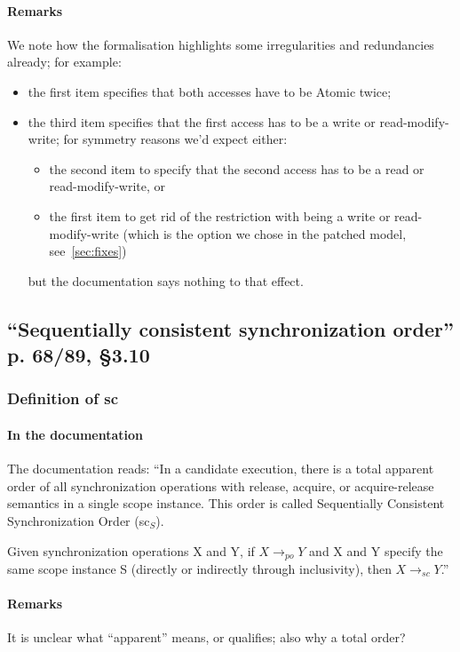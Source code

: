 \documentclass[a4paper]{article}
\begin{document}
\paragraph{Remarks}
We note how the formalisation highlights some irregularities and redundancies
already; for example:
\begin{itemize}
\item the first item specifies that both accesses have to be Atomic twice;
\item the third item specifies that the first access has to be a write or
read-modify-write; for symmetry reasons we'd expect either:
\begin{itemize}
\item the second item to specify that the second access has to be a read or
read-modify-write, or 
\item the first item to get rid of the restriction with being a write or
read-modify-write (which is the option we chose in the patched model,
see~\mysec\ref{sec:fixes})
\end{itemize}
but the documentation says nothing to that effect.
\end{itemize}

\subsection{``Sequentially consistent synchronization order'' p. 68/89, \S 3.10}

\subsubsection{Definition of sc}

\paragraph{In the documentation}
The documentation reads: ``In a candidate execution, there is a total apparent
order of all synchronization operations with release, acquire, or
acquire-release semantics in a single scope instance. This order is called
Sequentially Consistent Synchronization Order (sc$_S$).

Given synchronization operations X and Y, if $X \rightarrow_{po} Y$ and X and Y
specify the same scope instance S (directly or indirectly through inclusivity),
then $X \rightarrow_{sc} Y$.''

\paragraph{Remarks}
It is unclear what ``apparent'' means, or qualifies; also why a total order?
\end{document}
